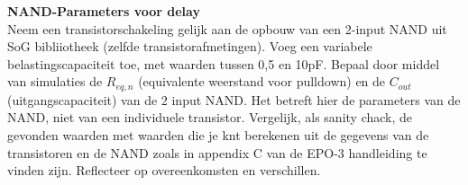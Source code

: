 \documentclass{article}
\begin{document}
\textbf {NAND-Parameters voor delay}\\

Neem een transistorschakeling gelijk aan de opbouw van een 2-input NAND uit SoG bibliiotheek (zelfde transistorafmetingen).
Voeg een variabele belastingscapaciteit toe, met waarden tussen 0,5 en 10pF. Bepaal door middel van simulaties de  $R_{eq,n}$ (equivalente weerstand voor pulldown) en de $C_{out}$ (uitgangscapaciteit) van de 2 input NAND. Het betreft hier de parameters van de NAND, niet van een individuele transistor. Vergelijk, als sanity chack, de gevonden waarden met waarden die je knt berekenen uit de gegevens van de transistoren en de NAND zoals in appendix C van de EPO-3 handleiding te vinden zijn. Reflecteer op overeenkomsten en verschillen.
\end{document}
